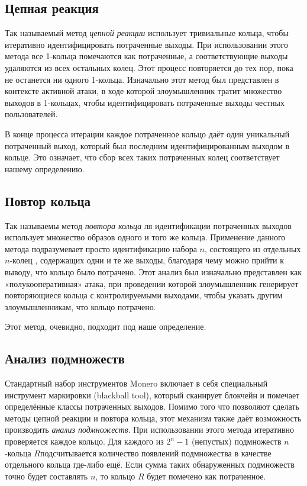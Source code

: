 \documentclass{mrl}
\begin{document}
\subsection{Цепная реакция}
Так называемый метод \textit{цепной реакции} использует тривиальные кольца, чтобы итеративно идентифицировать потраченные выходы. При использовании этого метода все 1-кольца помечаются как потраченные, а соответствующие выходы удаляются из всех остальных колец. Этот процесс повторяется до тех пор, пока не останется ни одного 1-кольца. Изначально этот метод был представлен в контексте активной атаки, в ходе которой злоумышленник тратит множество выходов в 1-кольцах, чтобы идентифицировать потраченные выходы честных пользователей.

В конце процесса итерации каждое потраченное кольцо даёт один уникальный потраченный выход, который был последним идентифицированным выходом в кольце. Это означает, что сбор всех таких потраченных колец соответствует нашему определению.

\subsection{Повтор кольца}
Так называемы метод \textit{повтора кольца} ля идентификации потраченных выходов использует множество образов одного и того же кольца. Применение данного метода подразумевает просто идентификацию набора $n$, состоящего из отдельных $n$-колец , содержащих одни и те же выходы, благодаря чему можно прийти к выводу, что кольцо было потрачено. Этот анализ был изначально представлен как «полукооперативная» атака, при проведении которой злоумышленник генерирует повторяющиеся кольца с контролируемыми выходами, чтобы указать другим злоумышленникам, что кольцо потрачено.

Этот метод, очевидно, подходит под наше определение.

\subsection{Анализ подмножеств}
Стандартный набор инструментов Monero включает в себя специальный инструмент маркировки \linebreak (blackball tool), который сканирует блокчейн и помечает определённые классы потраченных выходов. Помимо того что позволяют сделать методы цепной реакции и повтора кольца, этот механизм также даёт возможность производить \textit{анализ подмножеств}. При использовании этого метода итеративно проверяется каждое кольцо. Для каждого из $2^n-1$ (непустых) подмножеств $n$-кольца $R$подсчитывается количество появлений подмножества в качестве отдельного кольца где-либо ещё. Если сумма таких обнаруженных подмножеств точно будет составлять $n$, то кольцо $R$ будет помечено как потраченное.
\end{document}
